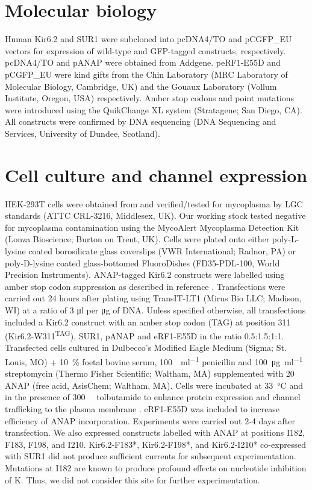\section{Molecular biology}
Human Kir6.2 and SUR1 were subcloned into pcDNA4/TO and pCGFP\_EU vectors for expression of wild-type and GFP-tagged constructs, respectively.
pcDNA4/TO and pANAP were obtained from Addgene.
peRF1-E55D and pCGFP\_EU were kind gifts from the Chin Laboratory (MRC Laboratory of Molecular Biology, Cambridge, UK) and the Gouaux Laboratory (Vollum Institute, Oregon, USA) respectively.
Amber stop codons and point mutations were introduced using the QuikChange XL system (Stratagene; San Diego, CA).
All constructs were confirmed by DNA sequencing (DNA Sequencing and Services, University of Dundee, Scotland).

\section{Cell culture and channel expression}
HEK-293T cells were obtained from and verified/tested for mycoplasma by LGC standards (ATTC CRL-3216, Middlesex, UK).
Our working stock tested negative for mycoplasma contamination using the MycoAlert Mycoplasma Detection Kit (Lonza Bioscience; Burton on Trent, UK).
Cells were plated onto either poly-L-lysine coated borosilicate glass coverslips (VWR International; Radnor, PA) or poly-D-lysine coated glass-bottomed FluoroDishes (FD35-PDL-100, World Precision Instruments).
ANAP-tagged Kir6.2 constructs were labelled using amber stop codon suppression as described in reference \cite{chatterjee_genetically_2013}.
Transfections were carried out 24 hours after plating using TransIT-LT1 (Mirus Bio LLC; Madison, WI) at a ratio of 3 \si{\micro\litre} per \si{\micro\gram} of DNA.
Unless specified otherwise, all transfections included a Kir6.2 construct with an amber stop codon (TAG) at position 311 (Kir6.2-W311\textsuperscript{TAG}), SUR1, pANAP and eRF1-E55D in the ratio 0.5:1.5:1:1.
Transfected cells cultured in Dulbecco’s Modified Eagle Medium (Sigma; St. Louis, MO) + \SI{10}{\percent} foetal bovine serum, \SI{100}{\Unit\per\milli\litre} penicillin and \SI{100}{\micro\gram\per\milli\litre} streptomycin (Thermo Fisher Scientific; Waltham, MA) supplemented with \SI{20}{\milli\Molar} ANAP (free acid, AsisChem; Waltham, MA).
Cells were incubated at \SI{33}{\degreeCelsius} and in the presence of \SI{300}{\micro\Molar} tolbutamide to enhance protein expression and channel trafficking to the plasma membrane \cite{yan_sulfonylureas_2004, martin_pharmacological_2013}.
eRF1-E55D was included to increase efficiency of ANAP incorporation.
Experiments were carried out 2-4 days after transfection.
We also expressed constructs labelled with ANAP at positions I182, F183, F198, and I210.
Kir6.2-F183*, Kir6.2-F198*, and Kir6.2-I210* co-expressed with SUR1 did not produce sufficient currents for subsequent experimentation.
Mutations at I182 are known to produce profound effects on nucleotide inhibition of K\ATP{}.
Thus, we did not consider this site for further experimentation.

